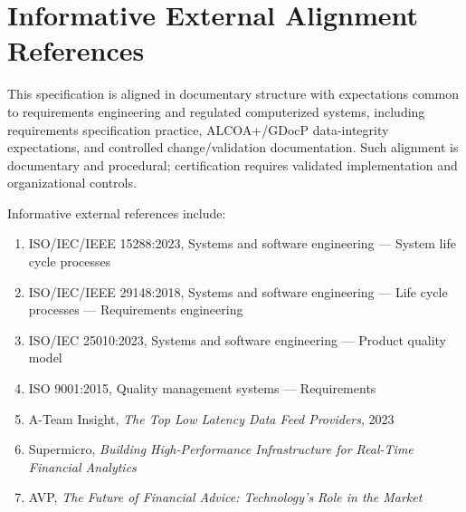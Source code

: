 \section{Informative External Alignment References}

This specification is aligned in documentary structure with expectations common to requirements engineering and regulated computerized systems, including requirements specification practice, ALCOA+/GDocP data-integrity expectations, and controlled change/validation documentation. Such alignment is documentary and procedural; certification requires validated implementation and organizational controls.

Informative external references include:
\begin{enumerate}[leftmargin=1.2cm]
    \item ISO/IEC/IEEE 15288:2023, Systems and software engineering --- System life cycle processes
    \item ISO/IEC/IEEE 29148:2018, Systems and software engineering --- Life cycle processes --- Requirements engineering
    \item ISO/IEC 25010:2023, Systems and software engineering --- Product quality model
    \item ISO 9001:2015, Quality management systems --- Requirements
    \item A-Team Insight, \emph{The Top Low Latency Data Feed Providers}, 2023
    \item Supermicro, \emph{Building High-Performance Infrastructure for Real-Time Financial Analytics}
    \item AVP, \emph{The Future of Financial Advice: Technology's Role in the Market}
\end{enumerate}
